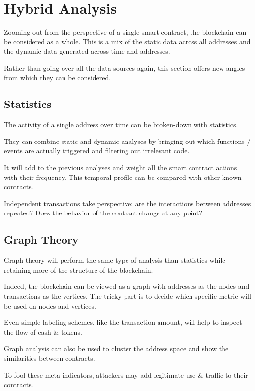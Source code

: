 \section{Hybrid Analysis} \label{sec:data-hybrid}

Zooming out from the perspective of a single smart contract, the blockchain can be considered as a whole.
This is a mix of the static data across all addresses and the dynamic data generated across time and addresses.

Rather than going over all the data sources again, this section offers new angles from which they can be considered.

\subsection{Statistics}

The activity of a single address over time can be broken-down with statistics.

They can combine static and dynamic analyses by bringing out which functions / events are actually triggered and filtering out irrelevant code.

It will add to the previous analyses and weight all the smart contract actions with their frequency.
This temporal profile can be compared with other known contracts.

Independent transactions take perspective: are the interactions between addresses repeated?
Does the behavior of the contract change at any point?

\subsection{Graph Theory} \label{sec:hybrid-graph}

Graph theory will perform the same type of analysis than statistics while retaining more of the structure of the blockchain.

Indeed, the blockchain can be viewed as a graph with addresses as the nodes and transactions as the vertices.
The tricky part is to decide which specific metric will be used on nodes and vertices.

Even simple labeling schemes, like the transaction amount, will help to inspect the flow  of cash \& tokens.

Graph analysis can also be used to cluster the address space and show the similarities between contracts.

To fool these meta indicators, attackers may add legitimate use \& traffic to their contracts. 

